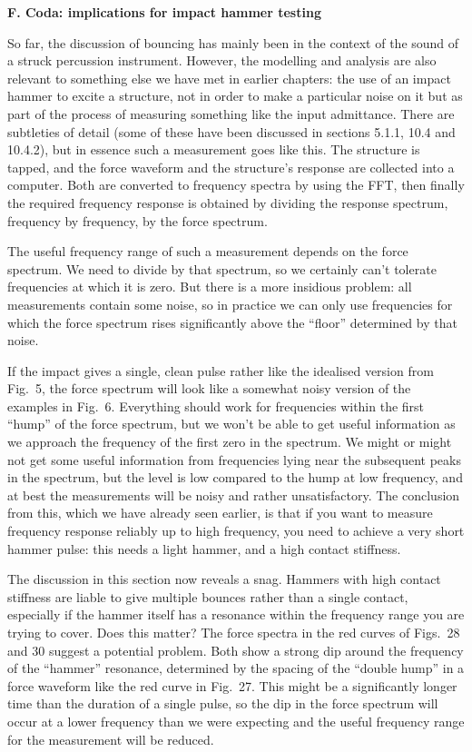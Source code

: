   \textbf{F. Coda: implications for impact hammer testing} 

  So far, the discussion of bouncing has mainly been in the context of the 
  sound of a struck percussion instrument. However, the modelling and analysis 
  are also relevant to something else we have met in earlier chapters: the use 
  of an impact hammer to excite a structure, not in order to make a particular 
  noise on it but as part of the process of measuring something like the input 
  admittance. There are subtleties of detail (some of these have been discussed 
  in sections 5.1.1, 10.4 and 10.4.2), but in essence such a measurement goes 
  like this. The structure is tapped, and the force waveform and the 
  structure’s response are collected into a computer. Both are converted to 
  frequency spectra by using the FFT, then finally the required frequency 
  response is obtained by dividing the response spectrum, frequency by 
  frequency, by the force spectrum. 

  The useful frequency range of such a measurement depends on the force 
  spectrum. We need to divide by that spectrum, so we certainly can’t tolerate 
  frequencies at which it is zero. But there is a more insidious problem: all 
  measurements contain some noise, so in practice we can only use frequencies 
  for which the force spectrum rises significantly above the “floor” determined 
  by that noise. 

  If the impact gives a single, clean pulse rather like the idealised version 
  from Fig.\ 5, the force spectrum will look like a somewhat noisy version of 
  the examples in Fig.\ 6. Everything should work for frequencies within the 
  first “hump” of the force spectrum, but we won’t be able to get useful 
  information as we approach the frequency of the first zero in the spectrum. 
  We might or might not get some useful information from frequencies lying near 
  the subsequent peaks in the spectrum, but the level is low compared to the 
  hump at low frequency, and at best the measurements will be noisy and rather 
  unsatisfactory. The conclusion from this, which we have already seen earlier, 
  is that if you want to measure frequency response reliably up to high 
  frequency, you need to achieve a very short hammer pulse: this needs a light 
  hammer, and a high contact stiffness. 

  The discussion in this section now reveals a snag. Hammers with high contact 
  stiffness are liable to give multiple bounces rather than a single contact, 
  especially if the hammer itself has a resonance within the frequency range 
  you are trying to cover. Does this matter? The force spectra in the red 
  curves of Figs.\ 28 and 30 suggest a potential problem. Both show a strong 
  dip around the frequency of the “hammer” resonance, determined by the spacing 
  of the “double hump” in a force waveform like the red curve in Fig.\ 27. This 
  might be a significantly longer time than the duration of a single pulse, so 
  the dip in the force spectrum will occur at a lower frequency than we were 
  expecting and the useful frequency range for the measurement will be reduced. 

